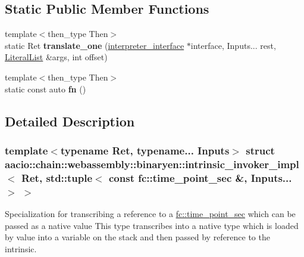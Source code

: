 \subsection*{Static Public Member Functions}
\begin{DoxyCompactItemize}
\item 
\mbox{\label{structaacio_1_1chain_1_1webassembly_1_1binaryen_1_1intrinsic__invoker__impl_3_01_ret_00_01std_1_834ee73b2a3756c62e2c1ce53ff47e23_a6c8745d022685d8037bcc4b3b492b3b7}} 
{\footnotesize template$<$then\+\_\+type Then$>$ }\\static Ret {\bfseries translate\+\_\+one} (\mbox{\hyperlink{structaacio_1_1chain_1_1webassembly_1_1binaryen_1_1interpreter__interface}{interpreter\+\_\+interface}} $\ast$interface, Inputs... rest, \mbox{\hyperlink{classstd_1_1vector}{Literal\+List}} \&args, int offset)
\item 
\mbox{\label{structaacio_1_1chain_1_1webassembly_1_1binaryen_1_1intrinsic__invoker__impl_3_01_ret_00_01std_1_834ee73b2a3756c62e2c1ce53ff47e23_a79cd9f5db47375c388d65fc0f1bfd35d}} 
{\footnotesize template$<$then\+\_\+type Then$>$ }\\static const auto {\bfseries fn} ()
\end{DoxyCompactItemize}


\subsection{Detailed Description}
\subsubsection*{template$<$typename Ret, typename... Inputs$>$\newline
struct aacio\+::chain\+::webassembly\+::binaryen\+::intrinsic\+\_\+invoker\+\_\+impl$<$ Ret, std\+::tuple$<$ const fc\+::time\+\_\+point\+\_\+sec \&, Inputs... $>$ $>$}

Specialization for transcribing a reference to a \mbox{\hyperlink{classfc_1_1time__point__sec}{fc\+::time\+\_\+point\+\_\+sec}} which can be passed as a native value This type transcribes into a native type which is loaded by value into a variable on the stack and then passed by reference to the intrinsic.


